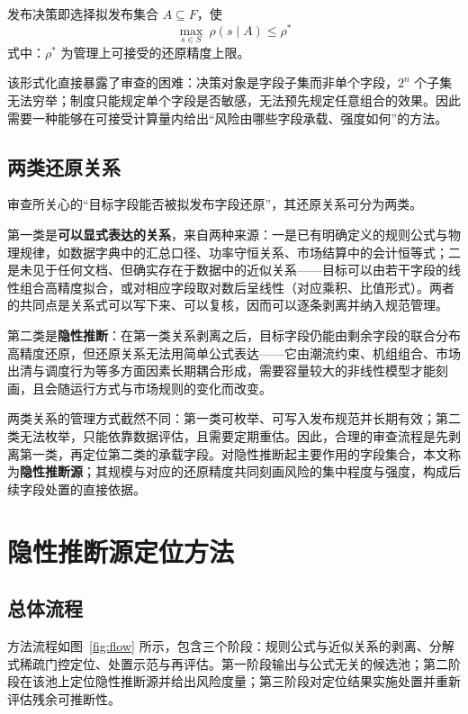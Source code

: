 \documentclass[UTF8,zihao=5,twoside]{ctexart}
\begin{document}
发布决策即选择拟发布集合 $A\subseteq F$，使
\begin{equation}
\max_{s\in S}\ \rho(s\mid A)\le \rho^{\ast}
\end{equation}
式中：$\rho^{\ast}$ 为管理上可接受的还原精度上限。

该形式化直接暴露了审查的困难：决策对象是字段子集而非单个字段，$2^n$ 个子集无法穷举；制度只能规定单个字段是否敏感，无法预先规定任意组合的效果。因此需要一种能够在可接受计算量内给出“风险由哪些字段承载、强度如何”的方法。

\subsection{两类还原关系}

审查所关心的“目标字段能否被拟发布字段还原”，其还原关系可分为两类。

第一类是\textbf{可以显式表达的关系}，来自两种来源：一是已有明确定义的规则公式与物理规律，如数据字典中的汇总口径、功率守恒关系、市场结算中的会计恒等式；二是未见于任何文档、但确实存在于数据中的近似关系——目标可以由若干字段的线性组合高精度拟合，或对相应字段取对数后呈线性（对应乘积、比值形式）。两者的共同点是关系式可以写下来、可以复核，因而可以逐条剥离并纳入规范管理。

第二类是\textbf{隐性推断}：在第一类关系剥离之后，目标字段仍能由剩余字段的联合分布高精度还原，但还原关系无法用简单公式表达——它由潮流约束、机组组合、市场出清与调度行为等多方面因素长期耦合形成，需要容量较大的非线性模型才能刻画，且会随运行方式与市场规则的变化而改变。

两类关系的管理方式截然不同：第一类可枚举、可写入发布规范并长期有效；第二类无法枚举，只能依靠数据评估，且需要定期重估。因此，合理的审查流程是先剥离第一类，再定位第二类的承载字段。对隐性推断起主要作用的字段集合，本文称为\textbf{隐性推断源}；其规模与对应的还原精度共同刻画风险的集中程度与强度，构成后续字段处置的直接依据。

\section{隐性推断源定位方法}

\subsection{总体流程}

方法流程如图~\ref{fig:flow} 所示，包含三个阶段：规则公式与近似关系的剥离、分解式稀疏门控定位、处置示范与再评估。第一阶段输出与公式无关的候选池；第二阶段在该池上定位隐性推断源并给出风险度量；第三阶段对定位结果实施处置并重新评估残余可推断性。
\end{document}
